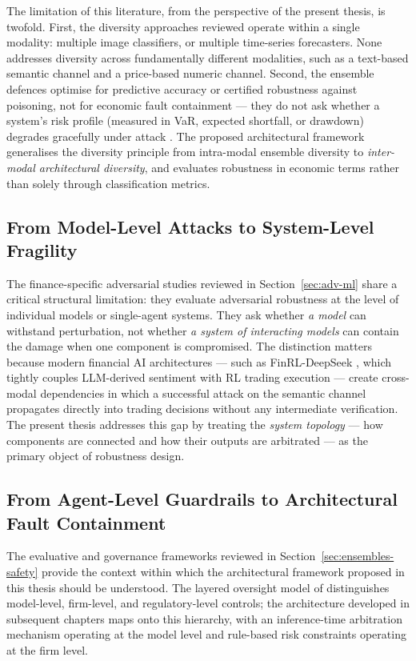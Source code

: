 The limitation of this literature, from the perspective of the present thesis, is
twofold. First, the diversity approaches reviewed operate within a single modality:
multiple image classifiers, or multiple time-series forecasters. None addresses
diversity across fundamentally different modalities, such as a text-based semantic
channel and a price-based numeric channel. Second, the ensemble defences optimise
for predictive accuracy or certified robustness against poisoning, not for economic
fault containment --- they do not ask whether a system's risk profile (measured in
VaR, expected shortfall, or drawdown) degrades gracefully under attack
\cite{baviskar2025robust}. The proposed architectural framework generalises the
diversity principle from intra-modal ensemble diversity to \textit{inter-modal
architectural diversity}, and evaluates robustness in economic terms rather than
solely through classification metrics.

\subsection{From Model-Level Attacks to System-Level Fragility}

The finance-specific adversarial studies reviewed in Section~\ref{sec:adv-ml} share
a critical structural limitation: they evaluate adversarial robustness at the level
of individual models or single-agent systems. They ask whether \textit{a model} can
withstand perturbation, not whether \textit{a system of interacting models} can
contain the damage when one component is compromised. The distinction matters because
modern financial AI architectures --- such as FinRL-DeepSeek \cite{benhenda2025finrl},
which tightly couples LLM-derived sentiment with RL trading execution --- create
cross-modal dependencies in which a successful attack on the semantic channel
propagates directly into trading decisions without any intermediate verification.
The present thesis addresses this gap by treating the \textit{system topology} ---
how components are connected and how their outputs are arbitrated --- as the primary
object of robustness design.


\subsection{From Agent-Level Guardrails to Architectural Fault Containment}

The evaluative and governance frameworks reviewed in
Section~\ref{sec:ensembles-safety} provide the context within which the
architectural framework proposed in this thesis should be understood. The
layered oversight model of \cite{kurshan_agentic_2025} distinguishes
model-level, firm-level, and regulatory-level controls; the architecture
developed in subsequent chapters maps onto this hierarchy, with an
inference-time arbitration mechanism operating at the model level and
rule-based risk constraints operating at the firm level.

